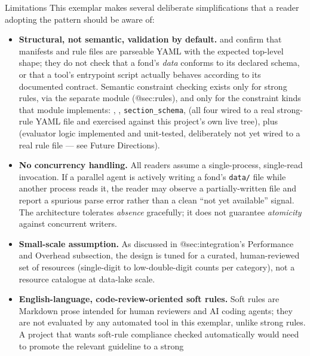 \documentclass[
  ignorenonframetext,
]{beamer}
\providecommand{\tightlist}{%
  \setlength{\itemsep}{0pt}\setlength{\parskip}{0pt}}
\begin{document}
\begin{frame}{Limitations}
\protect{}\label{limitations}
This exemplar makes several deliberate simplifications that a reader
adopting the pattern should be aware of:

\begin{itemize}
\tightlist
\item
  \textbf{Structural, not semantic, validation by default.}
   and 
  confirm that manifests and rule files are parseable YAML with the
  expected top-level shape; they do not check that a fond's \emph{data}
  conforms to its declared schema, or that a tool's entrypoint script
  actually behaves according to its documented contract. Semantic
  constraint checking exists only for strong rules, via the separate
   module (@sec:rules), and only for the
  constraint kinds that module implements: ,
  , \texttt{section\_schema},
   (all four wired to a real strong-rule YAML
  file and exercised against this project's own live tree), plus
   (evaluator logic implemented and
  unit-tested, deliberately not yet wired to a real rule file --- see
  Future Directions).
\item
  \textbf{No concurrency handling.} All readers assume a single-process,
  single-read invocation. If a parallel agent is actively writing a
  fond's \texttt{data/} file while another process reads it, the reader
  may observe a partially-written file and report a spurious parse error
  rather than a clean ``not yet available'' signal. The architecture
  tolerates \emph{absence} gracefully; it does not guarantee
  \emph{atomicity} against concurrent writers.
\item
  \textbf{Small-scale assumption.} As discussed in @sec:integration's
  Performance and Overhead subsection, the design is tuned for a
  curated, human-reviewed set of resources (single-digit to
  low-double-digit counts per category), not a resource catalogue at
  data-lake scale.
\item
  \textbf{English-language, code-review-oriented soft rules.} Soft rules
  are Markdown prose intended for human reviewers and AI coding agents;
  they are not evaluated by any automated tool in this exemplar, unlike
  strong rules. A project that wants soft-rule compliance checked
  automatically would need to promote the relevant guideline to a strong

\end{itemize}
\end{frame}
\end{document}
